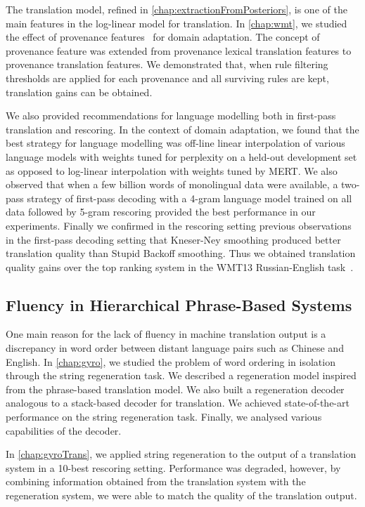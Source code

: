 The translation model, refined in \autoref{chap:extractionFromPosteriors},
is one of the main features in the log-linear model for translation.
In \autoref{chap:wmt}, we studied the effect of provenance
features~\citep{chiang-deneefe-pust:2011:ACL} for domain adaptation.
The concept of provenance feature was extended from provenance lexical translation
features to provenance translation features. We demonstrated that,
when rule filtering thresholds are applied for each provenance and all
surviving rules are kept, translation gains can be obtained.

We also provided recommendations for language modelling both
in first-pass translation and rescoring. In the context of
domain adaptation, we found that the best strategy for language modelling
was off-line linear interpolation of various language models with
weights tuned for perplexity on a held-out development set as opposed
to log-linear interpolation with weights tuned by MERT.
We also observed that when a few billion words of monolingual data were
available, a two-pass strategy of first-pass decoding with a 4-gram
language model trained on all data followed by 5-gram rescoring
provided the best performance in our experiments.
Finally we confirmed in the rescoring setting previous
observations~\citep{brants-popat-xu-och-dean:2007:EMNLP-CoNLL} in
the first-pass decoding setting
that Kneser-Ney smoothing produced better translation quality than
Stupid Backoff smoothing. Thus we obtained translation quality gains
over the top ranking system in the WMT13 Russian-English
task~\citep{pino-waite-xiao-degispert-flego-byrne:2013:WMT}.

\subsection{Fluency in Hierarchical Phrase-Based Systems}

One main reason for the lack of fluency in machine translation
output is a discrepancy in word order between distant language pairs
such as Chinese and English. In \autoref{chap:gyro}, we
studied the problem of word ordering in isolation through
the string regeneration task. We described a regeneration
model inspired from the phrase-based translation model. We also
built a regeneration decoder
analogous to a stack-based decoder for translation.
We achieved state-of-the-art performance on the string regeneration
task. Finally, we analysed various capabilities of the decoder.

In \autoref{chap:gyroTrans}, we applied string regeneration
to the output of a translation system in a 10-best rescoring setting.
Performance was degraded, however, by combining information obtained
from the translation system with the regeneration system, we were
able to match the quality of the translation output.


